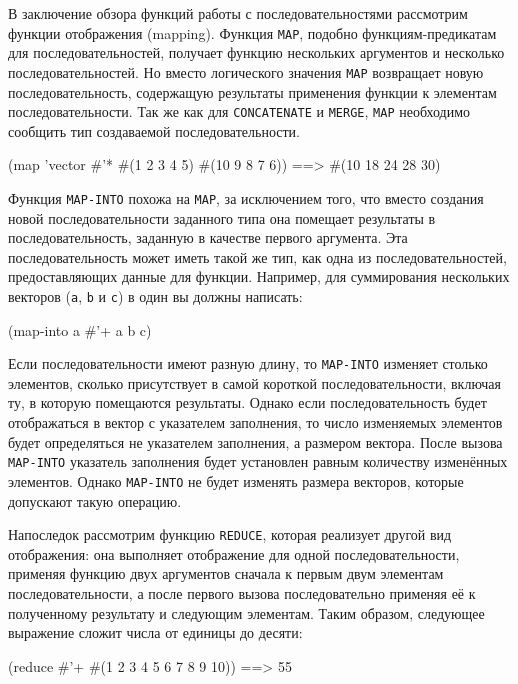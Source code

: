 В заключение обзора функций работы с последовательностями рассмотрим
функции отображения (mapping).  Функция \lstinline{MAP}, подобно функциям-предикатам для
последовательностей, получает функцию нескольких аргументов и несколько
последовательностей.  Но вместо логического значения \lstinline{MAP} возвращает новую
последовательность, содержащую результаты применения функции к элементам
последовательности.  Так же как для \lstinline{CONCATENATE} и \lstinline{MERGE}, \lstinline{MAP}
необходимо сообщить тип создаваемой последовательности.

\begin{myverb}
  (map 'vector #'* #(1 2 3 4 5) #(10 9 8 7 6)) ==> #(10 18 24 28 30)
\end{myverb}

Функция \lstinline{MAP-INTO} похожа на \lstinline{MAP}, за исключением того, что вместо создания
новой последовательности заданного типа она помещает результаты в последовательность,
заданную в качестве первого аргумента.  Эта последовательность может иметь такой же тип,
как одна из последовательностей, предоставляющих данные для функции.  Например, для
суммирования нескольких векторов (\lstinline{a}, \lstinline{b} и \lstinline{c}) в один вы должны
написать:

\begin{myverb}
  (map-into a #'+ a b c)
\end{myverb}

Если последовательности имеют разную длину, то \lstinline{MAP-INTO} изменяет столько элементов,
сколько присутствует в самой короткой последовательности, включая ту, в которую помещаются
результаты.  Однако если последовательность будет отображаться в вектор с указателем
заполнения, то число изменяемых элементов будет определяться не указателем заполнения, а
размером вектора.  После вызова \lstinline{MAP-INTO} указатель заполнения будет установлен
равным количеству изменённых элементов. Однако \lstinline{MAP-INTO} не будет изменять размера
векторов, которые допускают такую операцию.

Напоследок рассмотрим функцию \lstinline{REDUCE},
которая реализует другой вид отображения: она выполняет отображение для
одной последовательности, применяя функцию двух аргументов сначала к первым двум элементам
последовательности, а после первого вызова последовательно применяя её к полученному
результату и следующим элементам.  Таким образом, следующее выражение сложит числа от
единицы до десяти:

\begin{myverb}
  (reduce #'+ #(1 2 3 4 5 6 7 8 9 10)) ==> 55
\end{myverb}

